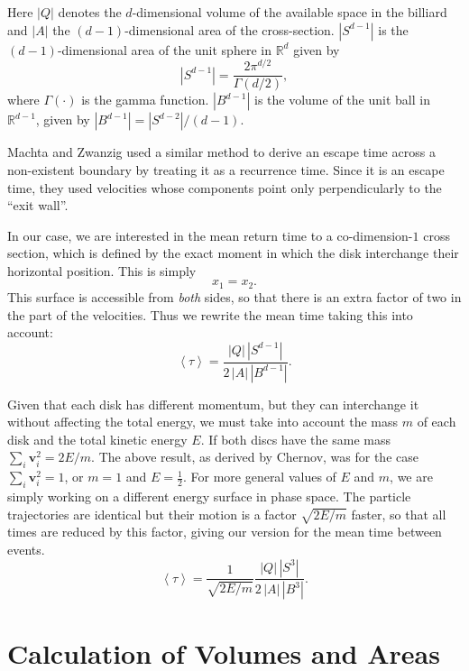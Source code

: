 \documentclass[a4paper,10pt]{article}
\newcommand{\mean}[1]{\left \langle #1 \right \rangle}
\newcommand{\RR}{\mathbb{R}}
\newcommand{\vv}{\mathbf{v}}
\begin{document}
Here $|Q|$ denotes the $d$-dimensional volume of the available space in the billiard and 
$|A|$ the $(d-1)$-dimensional area of the cross-section.
 $|S^{d-1}|$ is the $(d-1)$-dimensional area of the unit sphere in $\RR^d$ given by
\begin{equation}
  |S^{d-1}| = \frac{2 \pi^{d/2}}{\Gamma(d/2)},
\end{equation}
where $\Gamma(\cdot)$ is the gamma function. 
$|B^{d-1}|$ is the volume of the unit ball 
in $\RR^{d-1}$, given by $|B^{d-1}| = |S^{d-2}| / (d-1)$.

Machta and Zwanzig \cite{MachtaZwan} used a similar method to derive an escape 
time across a non-existent boundary by treating it as a recurrence time.
Since it is an escape time, they used velocities whose components point only 
perpendicularly to the ``exit wall''.

In our case, we are interested in the mean return time to a co-dimension-$1$ cross section, 
which is defined by the exact moment
in which the disk interchange their horizontal position. This is simply
\begin{equation} \label{condchoque}
x_1 = x_2.
\end{equation}
This surface is accessible from \emph{both} sides, 
so that there is an extra factor of two in the part of the velocities. Thus 
we rewrite the mean time taking this into account: 
\begin{equation}
 \mean{\tau} = \frac{|Q| \, |S^{d-1}|} {2 \, |A| \, |B^{d-1}|}.	
\end{equation}


Given that each disk has different momentum, but
they can interchange it without affecting the
total energy, we must take into account the mass $m$ of each disk and the total kinetic energy $E$.
If both discs have the same mass $\sum_i \vv_i^2 = 2E / m$.
The above result, as derived by Chernov, was for the case $\sum_i \vv_i^2 = 1$, or $m=1$ and $E=\frac{1}{2}$.  
For more general values of $E$ and $m$, we are simply working on a different energy surface in phase space. 
The particle trajectories are identical but their motion is a factor
$\sqrt{2E/m}$ faster, so that all times are reduced by this factor, giving our version for
the mean time between events.
\begin{equation}
  \mean{\tau} = \frac{1}{\sqrt{2E / m}} 
\frac{|Q| \, |S^3|} {2 \, |A| \, |B^3|}.	
\end{equation}



\section{Calculation of Volumes and Areas}
\end{document}
